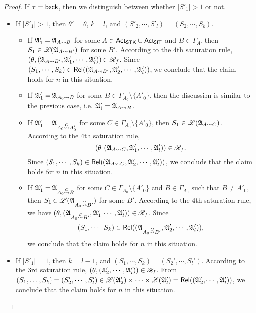 \begin{proof}
If $\tau = {\mathsf{back} }$, then we distinguish between whether $|S'_1| > 1$ or not. 
\begin{itemize}
\item If $|S'_1| > 1$, then $\theta' = \theta$, $k=l$, and $(S'_2, \cdots, S'_l) = (S_2, \cdots, S_k)$. 
\begin{itemize}
\item If ${\mathfrak{A} }'_1 = {\mathfrak{A} }_{A \rightsquigarrow B}$  for some $A \in {\sf Act}_{\sf STK} \cup {\sf Act}_{\sf SIT}$ and $B \in \Gamma_A$, then $S_1 \in {\mathscr{L} }({\mathfrak{A} }_{A \rightsquigarrow B'})$ for some $B'$.  According to the 4th saturation rule, $(\theta, ({\mathfrak{A} }_{A \rightsquigarrow B'}, {\mathfrak{A} }'_1, \cdots, {\mathfrak{A} }'_l)) \in \mathscr{R}_f$. Since $(S_1, \cdots, S_k) \in \mathsf{Rel}(({\mathfrak{A} }_{A \rightsquigarrow B'}, {\mathfrak{A} }'_2, \cdots, {\mathfrak{A} }'_l))$, we conclude that the claim holds for $n$ in this situation. 
%
\item If ${\mathfrak{A} }'_1 = {\mathfrak{A} }_{A_0 \rightsquigarrow B}$  for some $B \in \Gamma_{A_0} \setminus \{A'_0\}$, then the discussion is similar to the previous case, i.e. ${\mathfrak{A} }'_1 = {\mathfrak{A} }_{A \rightsquigarrow B}$. 
%
\item If ${\mathfrak{A} }'_1 = {\mathfrak{A} }_{A_0 \stackrel{C}{\rightsquigarrow} A'_0}$ for some $C \in \Gamma_{A_0} \setminus \{A'_0\}$, then $S_1 \in {\mathscr{L} }({\mathfrak{A} }_{A \rightsquigarrow C})$. According to the 4th saturation rule, 
$$(\theta, ({\mathfrak{A} }_{A \rightsquigarrow C}, {\mathfrak{A} }'_1, \cdots, {\mathfrak{A} }'_l)) \in \mathscr{R}_f.$$ 
Since $(S_1, \cdots, S_k) \in \mathsf{Rel}(({\mathfrak{A} }_{A \rightsquigarrow C}, {\mathfrak{A} }'_2, \cdots, {\mathfrak{A} }'_l))$, we conclude that the claim holds for $n$ in this situation. 
%
\item If ${\mathfrak{A} }'_1 = {\mathfrak{A} }_{A_0 \stackrel{C}{\rightsquigarrow} B}$ for some $C \in \Gamma_{A_0} \setminus \{A'_0\}$ and $B \in \Gamma_{A_0}$ such that $B \neq A'_0$, then $S_1 \in {\mathscr{L} }({\mathfrak{A} }_{A_0 \stackrel{C}{\rightsquigarrow} B'})$ for some $B'$. According to the 4th saturation rule, we have $(\theta, ({\mathfrak{A} }_{A_0 \stackrel{C}{\rightsquigarrow} B'}, {\mathfrak{A} }'_1, \cdots, {\mathfrak{A} }'_l)) \in \mathscr{R}_f$. Since 
%
$$(S_1, \cdots, S_k) \in \mathsf{Rel}(({\mathfrak{A} }_{A_0 \stackrel{C}{\rightsquigarrow} B'}, {\mathfrak{A} }'_2, \cdots, {\mathfrak{A} }'_l)),$$ 
%
we conclude that the claim holds for $n$ in this situation. 
%
\end{itemize}
%
\item If $|S'_1| = 1$, then $k = l - 1$, and $(S_1,\cdots,S_k) = (S_2',\cdots,S_l')$. According to the 3rd saturation rule, $(\theta, ({\mathfrak{A} }_2',\cdots,{\mathfrak{A} }_l')) \in \mathscr{R}_f$. From $(S_1,\dots,S_k) = (S'_2, \cdots, S'_l) \in {\mathscr{L} }({\mathfrak{A} }_2') \times \cdots \times {\mathscr{L} }({\mathfrak{A} }_l') = \mathsf{Rel}(({\mathfrak{A} }'_2, \cdots, {\mathfrak{A} }'_l))$, we conclude that the claim holds for $n$ in this situation. 
\end{itemize}



\end{proof}
